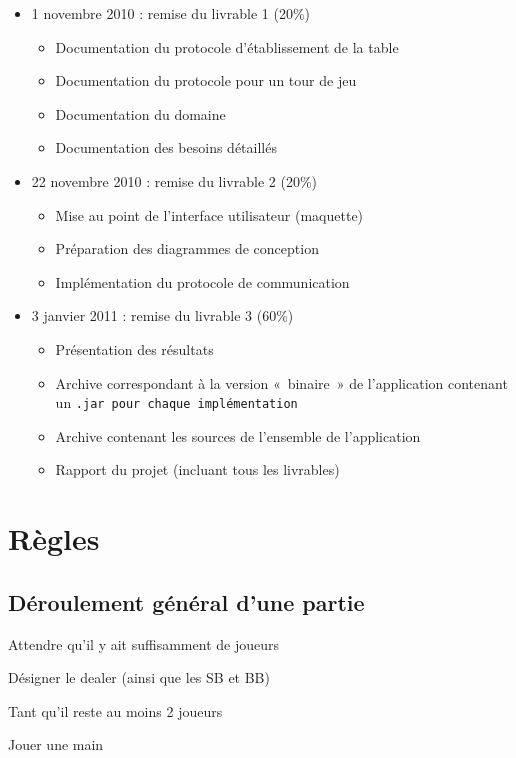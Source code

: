 \documentclass[a4paper]{article}
\begin{document}
\begin{itemize}
	\item 1 novembre 2010 : remise du livrable 1 (20\%)
	\begin{itemize}
		\item Documentation du protocole d'établissement de la table
		\item Documentation du protocole pour un tour de jeu
		\item Documentation du domaine
		\item Documentation des besoins détaillés
	\end{itemize}
	\item 22 novembre 2010 : remise du livrable 2 (20\%)
	\begin{itemize}
		\item Mise au point de l'interface utilisateur (maquette)
		\item Préparation des diagrammes de conception
		\item Implémentation du protocole de communication
	\end{itemize}
	\item 3 janvier 2011 : remise du livrable 3 (60\%)
	\begin{itemize}
		\item Présentation des résultats
		\item Archive correspondant à la version «~binaire~» de l'application contenant un \tt .jar \rm pour chaque implémentation
		\item Archive contenant les sources de l'ensemble de l'application
		\item Rapport du projet (incluant tous les livrables)
	\end{itemize}
\end{itemize}

\section{Règles}

\subsection{Déroulement général d'une partie}

Attendre qu'il y ait suffisamment de joueurs

Désigner le dealer (ainsi que les SB et BB)

Tant qu'il reste au moins 2 joueurs

\hspace{1cm}Jouer une main
\end{document}
